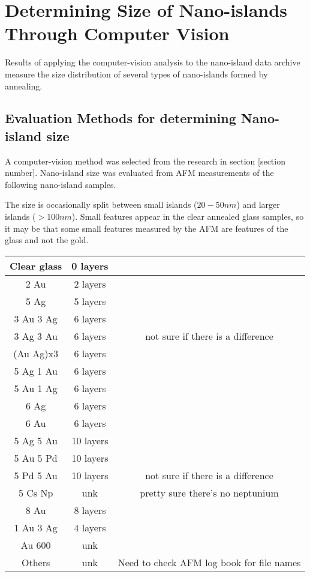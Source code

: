 
	\section{Determining Size of Nano-islands Through Computer Vision}
	
	Results of applying the computer-vision analysis to the nano-island data archive measure the size distribution of several types of nano-islands formed by annealing.
	
    \subsection{Evaluation Methods for determining Nano-island size}
	A computer-vision method was selected from the research in section [section number]. 
	Nano-island size was evaluated from AFM measurements of the following nano-island samples.
	
	The size is occasionally split between small islands ($20-50 nm$) and larger islands ($>100 nm$).  
	Small features appear in the clear annealed glass samples, 
	so it may be that some small features measured by the AFM are features of the glass and not the gold.
		
	
	\begin{tabular}{c | c || c}
		\hline 
		Clear glass & 0 layers & \\
		\hline
		2 Au & 2 layers & \\
		\hline
		5 Ag & 5 layers & \\
		\hline
		3 Au 3 Ag & 6 layers & \\
		3 Ag 3 Au & 6 layers & not sure if there is a difference\\
		(Au Ag)x3 & 6 layers & \\
		\hline
		5 Ag 1 Au & 6 layers & \\
		5 Au 1 Ag & 6 layers & \\
		6 Ag & 6 layers & \\
		6 Au & 6 layers & \\
		\hline
		5 Ag 5 Au & 10 layers & \\
		\hline
		5 Au 5 Pd & 10 layers & \\
		5 Pd 5 Au & 10 layers & not sure if there is a difference\\
		\hline
		5 Cs Np & unk & pretty sure there's no neptunium \\
		8 Au & 8 layers & \\
		1 Au 3 Ag & 4 layers & \\
		Au 600 & unk & \\
		Others & unk & Need to check AFM log book for file names \\
		\hline 
	\end{tabular}	